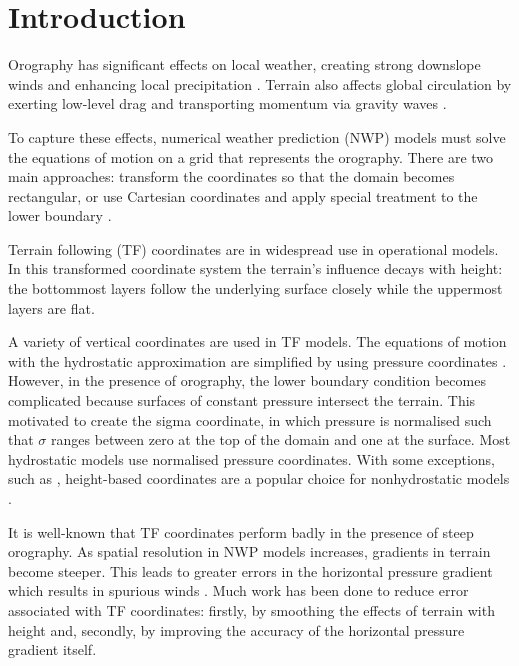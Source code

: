 \chapter{Introduction}

Orography has significant effects on local weather, creating strong downslope winds and enhancing local precipitation \autocite{barry2008}.  Terrain also affects global circulation by exerting low-level drag \autocite{lott-miller1997} and transporting momentum via gravity waves \autocite{mcfarlane1987}.

To capture these effects, numerical weather prediction (NWP) models must solve the equations of motion on a grid that represents the orography.
There are two main approaches: transform the coordinates so that the domain becomes rectangular, or use Cartesian coordinates and apply special treatment to the lower boundary \autocite{galchen-somerville1975}.

Terrain following (TF) coordinates are in widespread use in operational models.  In this transformed coordinate system the terrain's influence decays with height: the bottommost layers follow the underlying surface closely while the uppermost layers are flat.

A variety of vertical coordinates are used in TF models.  The equations of motion with the hydrostatic approximation are simplified by using pressure coordinates \autocite{eliassen1949}.  However, in the presence of orography, the lower boundary condition becomes complicated because surfaces of constant pressure intersect the terrain.  This motivated \textcite{phillips1957} to create the sigma coordinate, in which pressure is normalised such that $\sigma$ ranges between zero at the top of the domain and one at the surface.
Most hydrostatic models use normalised pressure coordinates.  With some exceptions, such as \textcite{xue-thorpe1991}, height-based coordinates are a popular choice for nonhydrostatic models \autocite{steppeler2003}.

It is well-known that TF coordinates perform badly in the presence of steep orography.  As spatial resolution in NWP models increases, gradients in terrain become steeper.  This leads to greater errors in the horizontal pressure gradient which results in spurious winds \autocite{dempsey-davis1998}.    Much work has been done to reduce error associated with TF coordinates: firstly, by smoothing the effects of terrain with height and, secondly, by improving the accuracy of the horizontal pressure gradient itself.

